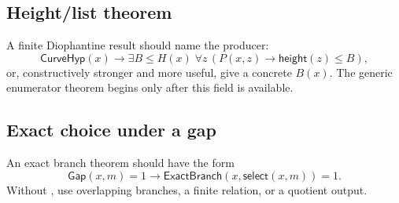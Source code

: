 \subsection{Height/list theorem}

A finite Diophantine result should name the producer:
\[
 \mathsf{CurveHyp}(x)\to
 \exists B\le H(x)\;\forall z\,(P(x,z)\to\mathsf{height}(z)\le B),
\]
or, constructively stronger and more useful, give a concrete $B(x)$.  The generic enumerator theorem begins only after this field is available.

\subsection{Exact choice under a gap}

An exact branch theorem should have the form
\[
 \mathsf{Gap}(x,m)=1\to
 \mathsf{ExactBranch}(x,\mathsf{select}(x,m))=1.
\]
Without , use overlapping branches, a finite relation, or a quotient output.
